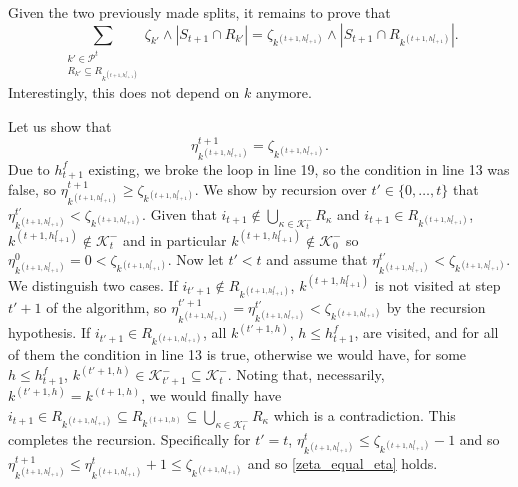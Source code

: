 \documentclass[
  11pt,
  a4paper,
]{article}
\theoremstyle{plain}
\theoremstyle{definition}
\theoremstyle{plain}
\theoremstyle{definition}
\theoremstyle{plain}
\theoremstyle{remark}
\begin{document}
Given the two previously made splits, it remains to prove that
\begin{equation*}
\sum_{\substack{k'\in\mathcal{P}^{t}\\R_{k'}\subseteq  R_{  k^{(t+1,h^f_{t+1})}} }} \zeta_{k'}\wedge |S_{t+1}\cap R_{k'}| =  \zeta_{ k^{(t+1,h^f_{t+1})}}\wedge |S_{t+1}\cap R_{ k^{(t+1,h^f_{t+1})}}|.
\end{equation*} Interestingly, this does not depend on \(k\) anymore.

Let us show that \begin{equation}
\eta^{t+1}_{k^{(t+1,h^f_{t+1})} }= \zeta_{ k^{(t+1,h^f_{t+1})}}.
\label{zeta_equal_eta}
\end{equation} Due to \(h^f_{t+1}\) existing, we broke the loop in line
19, so the condition in line 13 was false, so
\(\eta^{t+1}_{k^{(t+1,h^f_{t+1})} }\geq \zeta_{ k^{(t+1,h^f_{t+1})}}\).
We show by recursion over \(t'\in\{0,\dotsc,t\}\) that
\(\eta^{t'}_{k^{(t+1,h^f_{t+1})} }< \zeta_{ k^{(t+1,h^f_{t+1})}}\).
Given that
\(i_{t+1}\not\in\bigcup_{\kappa\in\mathcal{K}^-_{t}}R_{\kappa}\) and
\(i_{t+1}\in R_{k^{(t+1,h^f_{t+1})}}\),
\(k^{(t+1,h^f_{t+1})} \not\in \mathcal{K}^-_{t}\) and in particular
\(k^{(t+1,h^f_{t+1})} \not\in \mathcal{K}^-_{0}\) so
\(\eta^{0}_{k^{(t+1,h^f_{t+1})} }=0< \zeta_{ k^{(t+1,h^f_{t+1})}}\). Now
let \(t'<t\) and assume that
\(\eta^{t'}_{k^{(t+1,h^f_{t+1})} }< \zeta_{ k^{(t+1,h^f_{t+1})}}\). We
distinguish two cases. If \(i_{t'+1}\not\in R_{k^{(t+1,h^f_{t+1})}}\),
\(k^{(t+1,h^f_{t+1})}\) is not visited at step \(t'+1\) of the
algorithm, so
\(\eta^{t'+1}_{k^{(t+1,h^f_{t+1})} }=\eta^{t'}_{k^{(t+1,h^f_{t+1})} }< \zeta_{ k^{(t+1,h^f_{t+1})}}\)
by the recursion hypothesis. If \(i_{t'+1}\in R_{k^{(t+1,h^f_{t+1})}}\),
all \(k^{(t'+1,h)}\), \(h\leq h^f_{t+1}\), are visited, and for all of
them the condition in line 13 is true, otherwise we would have, for some
\(h\leq h^f_{t+1}\),
\(k^{(t'+1,h)}\in\mathcal{K}^-_{t'+1}\subseteq\mathcal{K}^-_{t}\).
Noting that, necessarily, \(k^{(t'+1,h)}=k^{(t+1,h)}\), we would finally
have
\(i_{t+1}\in R_{k^{(t+1,h^f_{t+1})}}\subseteq R_{k^{(t+1,h)}}\subseteq \bigcup_{\kappa\in\mathcal{K}^-_{t}}R_{\kappa}\)
which is a contradiction. This completes the recursion. Specifically for
\(t'=t\),
\(\eta^{t}_{k^{(t+1,h^f_{t+1})} }\leq \zeta_{ k^{(t+1,h^f_{t+1})}}-1\)
and so
\(\eta^{t+1}_{k^{(t+1,h^f_{t+1})} }\leq\eta^{t}_{k^{(t+1,h^f_{t+1})} }+1\leq \zeta_{ k^{(t+1,h^f_{t+1})}}\)
and so \eqref{zeta_equal_eta} holds.
\end{document}
